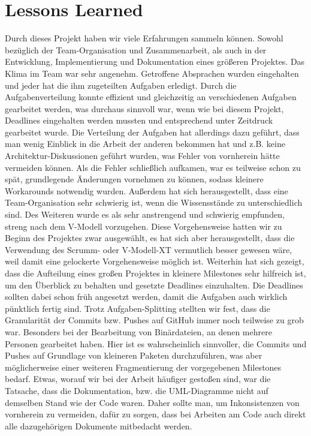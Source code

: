\documentclass[oneside,a4paper,titlepage]{scrartcl}              %
\begin{document}
\section{Lessons Learned}
Durch dieses Projekt haben wir viele Erfahrungen sammeln können. Sowohl bezüglich der Team-Organisation und Zusammenarbeit, als auch in der Entwicklung, Implementierung und Dokumentation eines größeren Projektes.\newline
Das Klima im Team war sehr angenehm. Getroffene Absprachen wurden eingehalten und jeder hat die ihm zugeteilten Aufgaben erledigt.\newline
Durch die Aufgabenverteilung konnte effizient und gleichzeitig an verschiedenen Aufgaben gearbeitet werden, was durchaus sinnvoll war, wenn wie bei diesem Projekt, Deadlines eingehalten werden mussten und entsprechend unter Zeitdruck gearbeitet wurde.\newline
Die Verteilung der Aufgaben hat allerdings dazu geführt, dass man wenig Einblick in die Arbeit der anderen bekommen hat und z.B. keine Architektur-Diskussionen geführt wurden, was Fehler von vornherein hätte vermeiden können. Als die Fehler schließlich aufkamen, war es teilweise schon zu spät, grundlegende Änderungen vornehmen zu können, sodass kleinere Workarounds notwendig wurden.\newline
Außerdem hat sich herausgestellt, dass eine Team-Organisation sehr schwierig ist, wenn die Wissensstände zu unterschiedlich sind.\newline
Des Weiteren wurde es als sehr anstrengend und schwierig empfunden, streng nach dem V-Modell vorzugehen. Diese Vorgehensweise hatten wir zu Beginn des Projektes zwar ausgewählt, es hat sich aber herausgestellt, dass die Verwendung des Scrumm- oder V-Modell-XT vermutlich besser gewesen wäre, weil damit eine gelockerte Vorgehensweise möglich ist.\newline
Weiterhin hat sich gezeigt, dass die Aufteilung eines großen Projektes in kleinere Milestones sehr hilfreich ist, um den Überblick zu behalten und gesetzte Deadlines einzuhalten. Die Deadlines sollten dabei schon früh angesetzt werden, damit die Aufgaben auch wirklich pünktlich fertig sind.\newline
Trotz Aufgaben-Splitting stellten wir fest, dass die Granularität der Commits bzw. Pushes auf GitHub immer noch teilweise zu grob war. Besonders bei der Bearbeitung von Binärdateien, an denen mehrere Personen gearbeitet haben. Hier ist es wahrscheinlich sinnvoller, die Commits und Pushes auf Grundlage von kleineren Paketen durchzuführen, was aber möglicherweise einer weiteren Fragmentierung der vorgegebenen Milestones bedarf.\newline
Etwas, worauf wir bei der Arbeit häufiger gestoßen sind, war die Tatsache, dass die Dokumentation, bzw. die UML-Diagramme nicht auf demselben Stand wie der Code waren. Daher sollte man, um Inkonsistenzen von vornherein zu vermeiden, dafür zu sorgen, dass bei Arbeiten am Code auch direkt alle dazugehörigen Dokumente mitbedacht werden.
\end{document}
